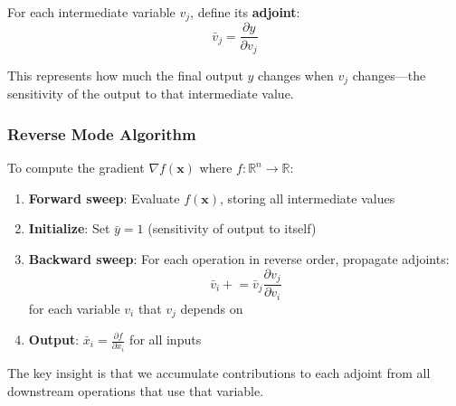 For each intermediate variable $v_j$, define its \textbf{adjoint}:
\begin{equation}
\bar{v}_j = \frac{\partial y}{\partial v_j}
\end{equation}

This represents how much the final output $y$ changes when $v_j$ changes---the sensitivity of the output to that intermediate value.

\subsubsection{Reverse Mode Algorithm}

To compute the gradient $\nabla f(\mathbf{x})$ where $f: \mathbb{R}^n \to \mathbb{R}$:

\begin{enumerate}
    \item \textbf{Forward sweep}: Evaluate $f(\mathbf{x})$, storing all intermediate values
    \item \textbf{Initialize}: Set $\bar{y} = 1$ (sensitivity of output to itself)
    \item \textbf{Backward sweep}: For each operation in reverse order, propagate adjoints:
    \begin{equation}
    \bar{v}_i \mathrel{+}= \bar{v}_j \frac{\partial v_j}{\partial v_i}
    \end{equation}
    for each variable $v_i$ that $v_j$ depends on
    \item \textbf{Output}: $\bar{x}_i = \frac{\partial f}{\partial x_i}$ for all inputs
\end{enumerate}

The key insight is that we accumulate contributions to each adjoint from all downstream operations that use that variable.

